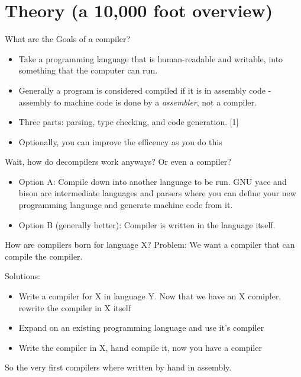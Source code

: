 \documentclass{beamer}
\begin{document}

\section{Theory (a 10,000 foot overview)}

\begin{frame}{What are the Goals of a compiler?}
  \begin{itemize}
    \item Take a programming language that is human-readable and
      writable, into something that the computer can run.
    \item Generally a program is considered compiled if it is in
      assembly code - assembly to machine code is done by a
      \textit{assembler}, not a compiler.
    \item Three parts: parsing, type checking, and code
      generation. [1]
    \item Optionally, you can improve the efficency as you do this
  \end{itemize}
\end{frame}

\begin{frame}{Wait, how do decompilers work anyways? Or even a
    compiler?}
  \begin{itemize}
    \item Option A: Compile down into another
      language to be run. GNU yacc and bison are intermediate
      languages and parsers where you can define your new programming
      language and generate machine code from it.
    \item Option B (generally better): Compiler is written in the
      language itself.
  \end{itemize}
\end{frame}

\begin{frame}{How are compilers born for language X?}
  Problem: We want a compiler that can compile the compiler.

  Solutions:
  \begin{itemize}
    \item Write a compiler for X in language Y. Now that we have an X
      comipler, rewrite the compiler in X itself
    \item Expand on an existing programming language and use it's compiler
    \item Write the compiler in X, hand compile it, now you have a
      compiler
  \end{itemize}
  So the very first compilers where written by hand in
  assembly. 
\end{frame}
\end{document}
